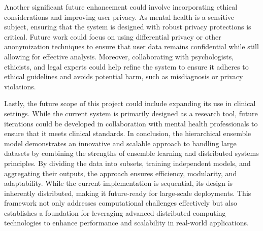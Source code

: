 \vspace{1em}
\noindent
Another significant future enhancement could involve incorporating ethical considerations and improving user privacy. As mental health is a sensitive subject, ensuring that the system is designed with robust privacy protections is critical. Future work could focus on using differential privacy or other anonymization techniques to ensure that user data remains confidential while still allowing for effective analysis. Moreover, collaborating with psychologists, ethicists, and legal experts could help refine the system to ensure it adheres to ethical guidelines and avoids potential harm, such as misdiagnosis or privacy violations.

\vspace{1em}
\noindent
Lastly, the future scope of this project could include expanding its use in clinical settings. While the current system is primarily designed as a research tool, future iterations could be developed in collaboration with mental health professionals to ensure that it meets clinical standards. In conclusion, the hierarchical ensemble model demonstrates an innovative and scalable approach to handling large datasets by combining the strengths of ensemble learning and distributed systems principles. By dividing the data into subsets, training independent models, and aggregating their outputs, the approach ensures efficiency, modularity, and adaptability. While the current implementation is sequential, its design is inherently distributed, making it future-ready for large-scale deployments. This framework not only addresses computational challenges effectively but also establishes a foundation for leveraging advanced distributed computing technologies to enhance performance and scalability in real-world applications.

\vspace{1em}

